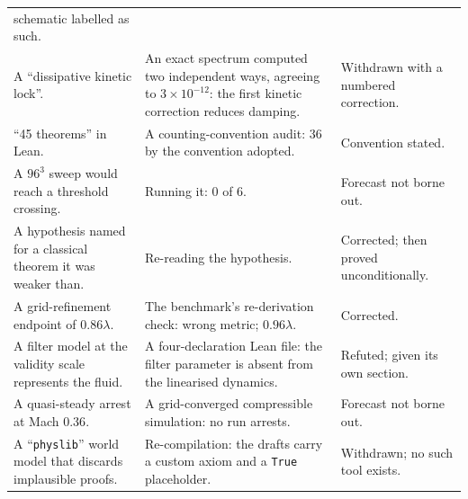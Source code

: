\documentclass[11pt]{article}
\begin{document}
\begin{center}
\begin{longtable}{@{}p{5.2cm}p{4.6cm}p{5.2cm}@{}}
schematic labelled as such. \\
A ``dissipative kinetic lock''. & An exact spectrum computed two independent ways, agreeing to
$3\times10^{-12}$: the first kinetic correction reduces damping. & Withdrawn with a numbered
correction. \\
``45 theorems'' in Lean. & A counting-convention audit: $36$ by the convention adopted. &
Convention stated. \\
A $96^3$ sweep would reach a threshold crossing. & Running it: $0$ of $6$. & Forecast not
borne out. \\
A hypothesis named for a classical theorem it was weaker than. & Re-reading the hypothesis. &
Corrected; then proved unconditionally. \\
A grid-refinement endpoint of $0.86\lambda$. & The benchmark's re-derivation check: wrong
metric; $0.96\lambda$. & Corrected. \\
A filter model at the validity scale represents the fluid. & A four-declaration Lean file: the
filter parameter is absent from the linearised dynamics. & Refuted; given its own section. \\
A quasi-steady arrest at Mach $0.36$. & A grid-converged compressible simulation: no run
arrests. & Forecast not borne out. \\
A ``\texttt{physlib}'' world model that discards implausible proofs. & Re-compilation: the
drafts carry a custom axiom and a \texttt{True} placeholder. & Withdrawn; no such tool
exists. \\
\bottomrule
\end{longtable}
\end{center}
\end{document}
